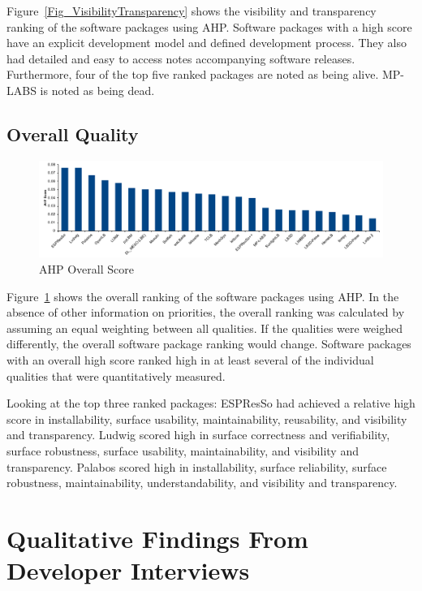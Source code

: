 \documentclass[final, 3p, times, authoryear]{elsarticle}
\begin{document}
Figure~\ref{Fig_VisibilityTransparency} shows the visibility and transparency
ranking of the software packages using AHP. Software packages with a high score
have an explicit development model and defined development process. They also
had detailed and easy to access notes accompanying software releases.
Furthermore, four of the top five ranked packages are noted as being alive.
MP-LABS is noted as being dead.

\subsection{Overall Quality}

\begin{figure}[h!]
	\centering
		\includegraphics[width=1.0\textwidth]{./figures/finalscore_chart.pdf}
		\caption{AHP Overall Score}
		\label{Fig_OverallScore}
\end{figure}

Figure~\ref{Fig_OverallScore} shows the overall ranking of the software packages
using AHP. In the absence of other information on priorities, the overall
ranking was calculated by assuming an equal weighting between all qualities. If the
qualities were weighed differently, the overall software package ranking would
change. Software packages with an overall high score ranked high in at least
several of the individual qualities that were quantitatively measured. 

Looking at the top three ranked packages: ESPResSo had achieved a
relative high score in installability, surface usability, maintainability, reusability, and visibility and transparency. Ludwig scored high in surface correctness and verifiability, surface robustness, surface usability, maintainability, and visibility and transparency. Palabos scored high in installability, surface reliability, surface robustness, maintainability, understandability, and visibility and transparency. 

\section{Qualitative Findings From Developer Interviews} \label{interviewresults}
\end{document}
